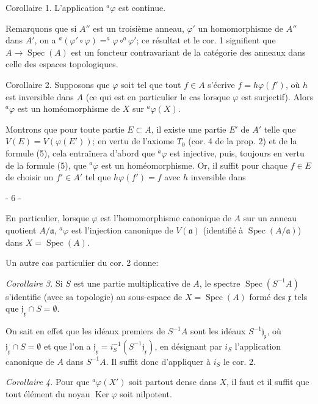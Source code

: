 Corollaire 1. L'application $^a\varphi$ est continue.

Remarquons que si $A''$ est un troisième anneau, $\varphi'$ un homomorphisme de $A''$ dans $A'$, on a $^a(\varphi' \circ \varphi) = ^a\varphi \circ ^a\varphi'$; ce résultat et le cor. 1 signifient que $A \to \operatorname{Spec}(A)$ est un foncteur contravariant de la catégorie des anneaux dans celle des espaces topologiques.

Corollaire 2. Supposons que $\varphi$ soit tel que tout $f \in A$ s'écrive $f = h\varphi(f')$, où $h$ est inversible dans $A$ (ce qui est en particulier le cas lorsque $\varphi$ est surjectif). Alors $^a\varphi$ est un homéomorphisme de $X$ sur $^a\varphi(X)$.

Montrons que pour toute partie $E \subset A$, il existe une partie $E'$ de $A'$ telle que $V(E) = V(\varphi(E'))$; en vertu de l'axiome $T_0$ (cor. 4 de la prop. 2) et de la formule (5), cela entraînera d'abord que $^a\varphi$ est injective, puis, toujours en vertu de la formule (5), que $^a\varphi$ est un homéomorphisme. Or, il suffit pour chaque $f \in E$ de choisir un $f' \in A'$ tel que $h\varphi(f') = f$ avec $h$ inversible dans

\newpage


- 6 -

En particulier, lorsque $\varphi$ est l'homomorphisme canonique de $A$ sur un anneau quotient $A/\mathfrak{a}$, $^a\varphi$ est l'injection canonique de $V(\mathfrak{a})$ (identifié à $\operatorname{Spec}(A/\mathfrak{a})$) dans $X = \operatorname{Spec}(A)$.

Un autre cas particulier du cor. 2 donne:

\emph{Corollaire 3.} Si $S$ est une partie multiplicative de $A$, le spectre $\operatorname{Spec}(S^{-1}A)$ s'identifie (avec sa topologie) au sous-espace de $X = \operatorname{Spec}(A)$ formé des $\mathfrak{x}$ tels que $\mathfrak{j}_{\mathfrak{x}} \cap S = \emptyset$.

On sait en effet que les idéaux premiers de $S^{-1}A$ sont les idéaux $S^{-1}\mathfrak{j}_{\mathfrak{x}}$, où $\mathfrak{j}_{\mathfrak{x}} \cap S = \emptyset$ et que l'on a $\mathfrak{j}_{\mathfrak{x}} = i_S^{-1}(S^{-1}\mathfrak{j}_{\mathfrak{x}})$, en désignant par $i_S$ l'application canonique de $A$ dans $S^{-1}A$. Il suffit donc d'appliquer à $i_S$ le cor. 2.

\emph{Corollaire 4.} Pour que $^a\varphi(X')$ soit partout dense dans $X$, il faut et il suffit que tout élément du noyau $\operatorname{Ker} \varphi$ soit nilpotent.

